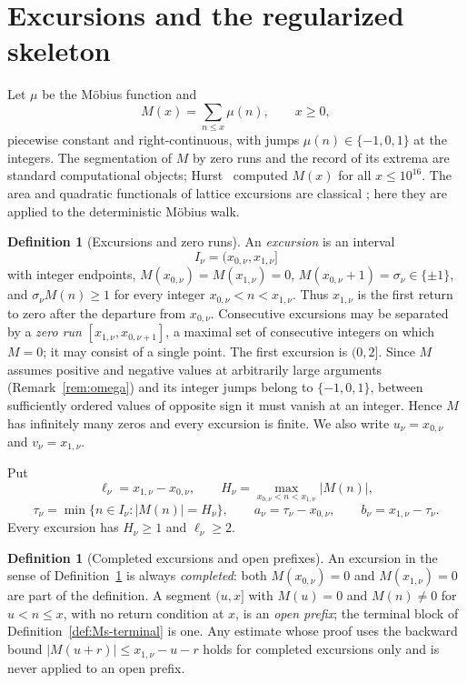 \documentclass[11pt]{amsart}
\numberwithin{equation}{section}
\theoremstyle{plain}
\theoremstyle{definition}
\newtheorem{definition}[theorem]{Definition}
\theoremstyle{remark}
\begin{document}
\normalsize

\section{Excursions and the regularized skeleton}
\label{sec:definitions}

Let $\mu$ be the M\"obius function and
\begin{equation}
\label{eq:mertens_def}
M(x)=\sum_{n\le x}\mu(n),\qquad x\ge0,
\end{equation}
piecewise constant and right-continuous, with jumps $\mu(n)\in\{-1,0,1\}$
at the integers. The segmentation of $M$ by zero runs and the record of its
extrema are standard computational objects; Hurst~\cite{Hurst18} computed
$M(x)$ for all $x\le10^{16}$. The area and quadratic functionals of lattice
excursions are classical
\cite{Takacs91,NguyenThe04,Richard05,Janson07,DKW15,CP17}; here they are
applied to the deterministic M\"obius walk.

\begin{definition}[Excursions and zero runs]
\label{def:excursion}
An \emph{excursion} is an interval
\[
I_\nu=(x_{0,\nu},x_{1,\nu}]
\]
with integer endpoints, $M(x_{0,\nu})=M(x_{1,\nu})=0$,
$M(x_{0,\nu}+1)=\sigma_\nu\in\{\pm1\}$, and
$\sigma_\nu M(n)\ge1$ for every integer $x_{0,\nu}<n<x_{1,\nu}$. Thus
$x_{1,\nu}$ is the first return to zero after the departure from
$x_{0,\nu}$. Consecutive excursions may be separated by a \emph{zero run}
$[x_{1,\nu},x_{0,\nu+1}]$, a maximal set of consecutive integers on which
$M=0$; it may consist of a single point. The first excursion is $(0,2]$.
Since $M$ assumes positive and negative values at arbitrarily large
arguments (Remark~\ref{rem:omega}) and its integer jumps belong to
$\{-1,0,1\}$, between sufficiently ordered values of opposite sign it must
vanish at an integer.  Hence $M$ has infinitely many zeros and every
excursion is finite. We also write $u_\nu=x_{0,\nu}$ and
$v_\nu=x_{1,\nu}$.

Put
\[
\ell_\nu=x_{1,\nu}-x_{0,\nu},\qquad
H_\nu=\max_{x_{0,\nu}<n<x_{1,\nu}}|M(n)|,
\]
\[
\tau_\nu=\min\{n\in I_\nu:|M(n)|=H_\nu\},\qquad
a_\nu=\tau_\nu-x_{0,\nu},\qquad b_\nu=x_{1,\nu}-\tau_\nu.
\]
Every excursion has $H_\nu\ge1$ and $\ell_\nu\ge2$.
\end{definition}

\begin{definition}[Completed excursions and open prefixes]
\label{def:completed-open}
An excursion in the sense of Definition~\ref{def:excursion} is always
\emph{completed}: both $M(x_{0,\nu})=0$ and $M(x_{1,\nu})=0$ are part of
the definition. A segment $(u,x]$ with $M(u)=0$ and $M(n)\ne0$ for
$u<n\le x$, with no return condition at $x$, is an \emph{open prefix}; the
terminal block of Definition~\ref{def:Ms-terminal} is one. Any estimate
whose proof uses the backward bound $|M(u+r)|\le x_{1,\nu}-u-r$ holds for
completed excursions only and is never applied to an open prefix.
\end{definition}
\end{document}
